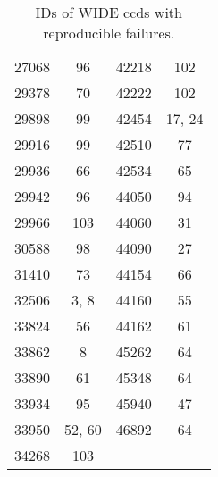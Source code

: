 \begin{table}[H]
\begin{tabular} {|c|c||c|c|}
27068 & 96                        & 42218 & 102    \\     
29378 & 70                        & 42222 & 102    \\     
29898 & 99                        & 42454 & 17, 24 \\  
29916 & 99                        & 42510 & 77     \\      
29936 & 66                        & 42534 & 65     \\      
29942 & 96                        & 44050 & 94     \\      
29966 & 103                       & 44060 & 31     \\      
30588 & 98                        & 44090 & 27     \\      
31410 & 73                        & 44154 & 66     \\      
32506 & 3, 8                      & 44160 & 55     \\      
33824 & 56                        & 44162 & 61     \\      
33862 & 8                         & 45262 & 64     \\      
33890 & 61                        & 45348 & 64     \\      
33934 & 95                        & 45940 & 47     \\      
33950 & 52, 60                    & 46892 & 64     \\      
34268 & 103                       &       &        \\
\hline
\end{tabular}
\caption{IDs of WIDE ccds with reproducible failures.}
\label{WIDEFailsTable}
\end{table} 
